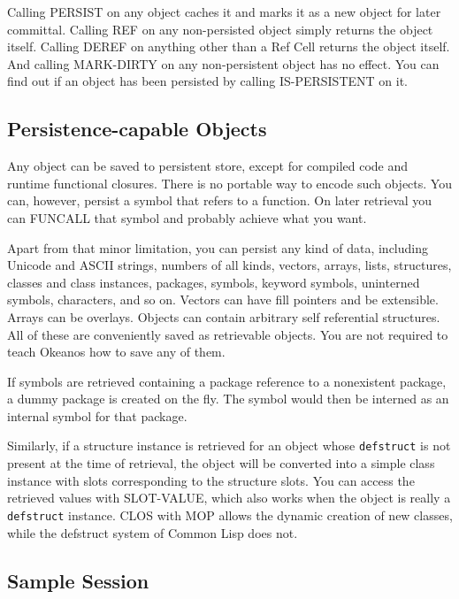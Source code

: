 \documentclass[article,oneside]{memoir}
\begin{document}
Calling {\ttfamily PERSIST} on any object caches it and marks it as a new object for later committal. Calling {\ttfamily REF} on any non-persisted object simply returns the object itself. Calling {\ttfamily DEREF} on anything other than a Ref Cell returns the object itself. And calling {\ttfamily MARK-DIRTY} on any non-persistent object has no effect. You can find out if an object has been persisted by calling {\ttfamily IS-PERSISTENT} on it.

\subsection{Persistence-capable Objects}
Any object can be saved to persistent store, except for compiled code and runtime functional closures. There is no portable way to encode such objects. You can, however, persist a symbol that refers to a function. On later retrieval you can {\ttfamily FUNCALL} that symbol and probably achieve what you want.

Apart from that minor limitation, you can persist any kind of data, including Unicode and ASCII strings, numbers of all kinds, vectors, arrays, lists, structures, classes and class instances, packages, symbols, keyword symbols, uninterned symbols, characters, and so on. Vectors can have fill pointers and be extensible. Arrays can be overlays. Objects can contain arbitrary self referential structures. All of these are conveniently saved as retrievable objects. You are not required to teach Okeanos how to save any of them.

If symbols are retrieved containing a package reference to a nonexistent package, a dummy package is created on the fly. The symbol would then be interned as an internal symbol for that package.

Similarly, if a structure instance is retrieved for an object whose \texttt{defstruct} is not present at the time of retrieval, the object will be converted into a simple class instance with slots corresponding to the structure slots. You can access the retrieved values with {\ttfamily SLOT-VALUE}, which also works when the object is really a \texttt{defstruct} instance. CLOS with MOP allows the dynamic creation of new classes, while the {\ttfamily defstruct} system of Common Lisp does not.

\subsection{Sample Session}
\end{document}
